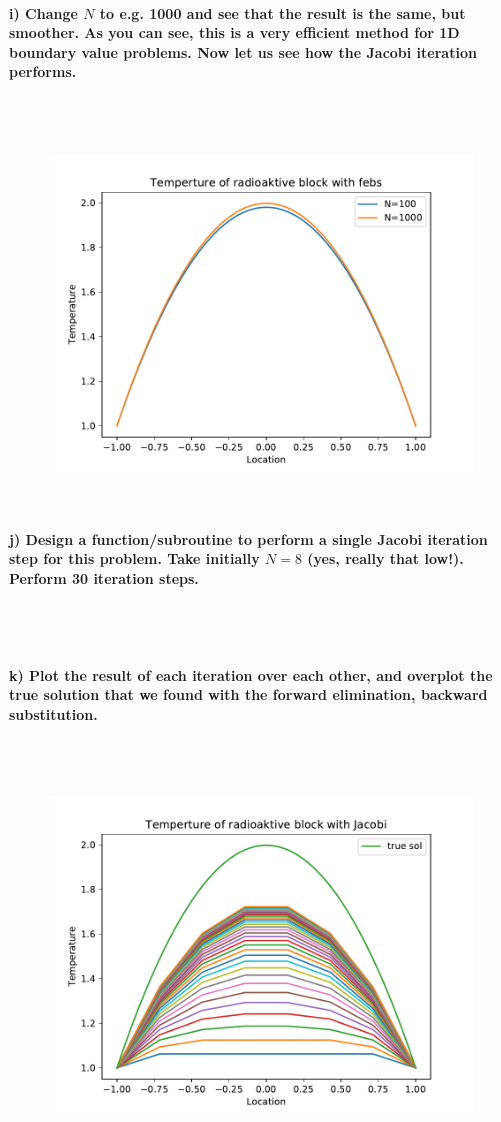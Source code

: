 \paragraph{
    i) Change $N$ to e.g. 1000 and see that the result is the same, but
    smoother. As you can see, this is a very efficient method for 1D
    boundary value problems. Now let us see how the Jacobi iteration
    performs.
} \ \\
    \\
    \begin{figure}[h!]
	\centering
	\includegraphics[width=.7\textwidth]{../figures/Aufg1h.pdf}
\end{figure} \ \\

\newpage
\paragraph{
    j) Design a function/subroutine to perform a single Jacobi iteration
    step for this problem. Take initially $N=8$ (yes, really that low!).
    Perform 30 iteration steps.
} \ \\
    \\

\paragraph{
    k) Plot the result of each iteration over each other, and overplot
    the true solution that we found with the forward elimination,
    backward substitution.
} \ \\
    \\
    \begin{figure}[h!]
        \centering
        \includegraphics[width=.7\textwidth]{../figures/Aufg1k.pdf}
    \end{figure} \ \\

